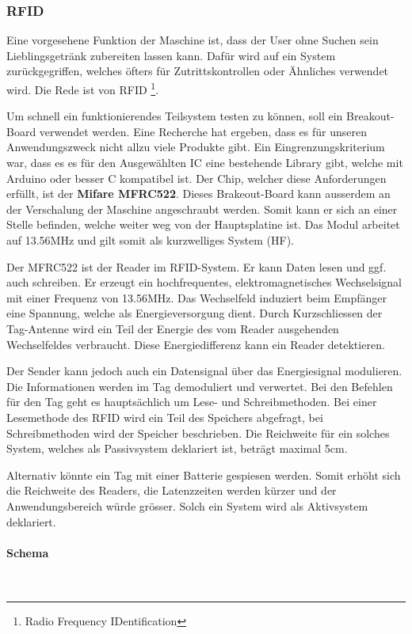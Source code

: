 \subsubsection{RFID}
\label{subsubsec:RFID}

Eine vorgesehene Funktion der Maschine ist, dass der User ohne Suchen sein Lieblingsgetränk zubereiten lassen kann. Dafür wird auf ein System zurückgegriffen, welches öfters für Zutrittskontrollen oder Ähnliches verwendet wird. Die Rede ist von RFID \footnote{Radio Frequency IDentification}.

Um schnell ein funktionierendes Teilsystem testen zu können, soll ein Breakout-Board verwendet werden. Eine Recherche hat ergeben, dass es für unseren Anwendungszweck nicht allzu viele Produkte gibt. Ein Eingrenzungskriterium war, dass es es für den Ausgewählten IC eine bestehende Library gibt, welche mit Arduino oder besser C kompatibel ist. Der Chip, welcher diese Anforderungen erfüllt, ist der \textbf{Mifare MFRC522}. Dieses Brakeout-Board kann ausserdem an der Verschalung der Maschine angeschraubt werden. Somit kann er sich an einer Stelle befinden, welche weiter weg von der Hauptsplatine ist.
Das Modul arbeitet auf 13.56MHz und gilt somit als kurzwelliges System (HF).

Der MFRC522 ist der Reader im RFID-System. Er kann Daten lesen und ggf. auch schreiben. Er erzeugt ein hochfrequentes, elektromagnetisches Wechselsignal mit einer Frequenz von 13.56MHz. Das Wechselfeld induziert beim Empfänger eine Spannung, welche als Energieversorgung dient. Durch Kurzschliessen der Tag-Antenne wird ein Teil der Energie des vom Reader ausgehenden Wechselfeldes verbraucht. Diese Energiedifferenz kann ein Reader detektieren.

Der Sender kann jedoch auch ein Datensignal über das Energiesignal modulieren. Die Informationen werden im Tag demoduliert und verwertet. Bei den Befehlen für den Tag geht es hauptsächlich um Lese- und Schreibmethoden. Bei einer Lesemethode des RFID wird ein Teil des Speichers abgefragt, bei Schreibmethoden wird der Speicher beschrieben. Die Reichweite für ein solches System, welches als Passivsystem deklariert ist, beträgt maximal 5cm.

Alternativ könnte ein Tag mit einer Batterie gespiesen werden. Somit erhöht sich die Reichweite des Readers, die Latenzzeiten werden kürzer und der Anwendungsbereich würde grösser. Solch ein System wird als Aktivsystem deklariert.

\paragraph{Schema}\mbox{}\\

